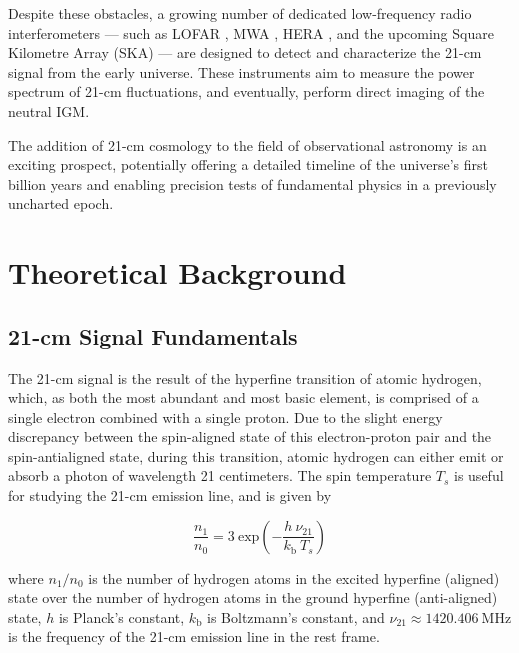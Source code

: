 \documentclass[floats,floatfix,showpacs,amssymb,prd,superscriptaddress,nofootinbib]{revtex4-2} %
\begin{document}
Despite these obstacles, a growing number of dedicated low-frequency radio interferometers — such as LOFAR \citep{van_Haarlem_2013}, MWA \citep{Beardsley_2019}, HERA \citep{DeBoer_2017}, and the upcoming Square Kilometre Array (SKA) \cite{Dewdney_2009} — are designed to detect and characterize the 21-cm signal from the early universe. These instruments aim to measure the power spectrum of 21-cm fluctuations, and eventually, perform direct imaging of the neutral IGM.

The addition of 21-cm cosmology to the field of observational astronomy is an exciting prospect, potentially offering a detailed timeline of the universe's first billion years and enabling precision tests of fundamental physics in a previously uncharted epoch.

\newpage
\section{Theoretical Background}
\subsection{21-cm Signal Fundamentals}
The 21-cm signal is the result of the hyperfine transition of atomic hydrogen, which, as both the most abundant and most basic element, is comprised of a single electron combined with a single proton. Due to the slight energy discrepancy between the spin-aligned state of this electron-proton pair and the spin-antialigned state, during this transition, atomic hydrogen can either emit or absorb a photon of wavelength 21 centimeters. The spin temperature $T_s$ is useful for studying the 21-cm emission line, and is given by \citep{Purcell_Field_1956, Scott_Rees_1990}

\begin{equation}
    \frac{n_1}{n_0} = 3 ~ \text{exp} \left( -\frac{h ~ \nu_{21}}{k_\text{b} ~ T_s} \right)
\end{equation}

\noindent where $n_1/n_0$ is the number of hydrogen atoms in the excited hyperfine (aligned) state over the number of hydrogen atoms in the ground hyperfine (anti-aligned) state, $h$ is Planck's constant, $k_\text{b}$ is Boltzmann's constant, and $\nu_{21} \approx 1420.406 ~\text{MHz}$ is the frequency of the 21-cm emission line in the rest frame. 
\end{document}
